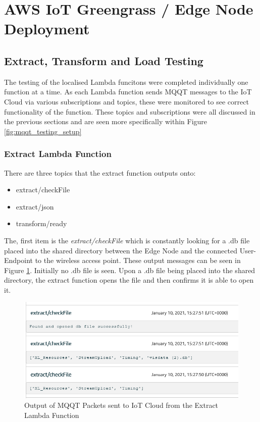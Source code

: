 \section{AWS IoT Greengrass / Edge Node Deployment}
\subsection{Extract, Transform and Load Testing}
The testing of the localised Lambda funcitons were completed individually one function at a time. As each Lambda function sends MQQT messages to the IoT Cloud via various subscriptions and topics, these were monitored to see correct functionality of the function. These topics and subscriptions were all discussed in the previous sections and are seen more specifically within Figure \ref{fig:mqqt_testing_setup}
\subsubsection{Extract Lambda Function}
There are three topics that the extract function outputs onto:
\begin{itemize}
    \item extract/checkFile
    \item extract/json
    \item transform/ready
\end{itemize}
The, first item is the \textit{extract/checkFile} which is constantly looking for a .db file placed into the shared directory between the Edge Node and the connected User-Endpoint to the wireless access point.  These output messages can be seen in Figure \ref{fig:extract_checkFile}. Initially no .db file is seen. Upon a .db file being placed into the shared directory, the extract function opens the file and then confirms it is able to open it.

\begin{figure}[ht]
    \centering
    \includegraphics[width=1\linewidth]{pages/Chapter5/Chapter 5 images/Lambda-Fns/extract_checkFile.png}
    \caption{Output of MQQT Packets sent to IoT Cloud from the Extract Lambda Function}
    \label{fig:extract_checkFile}
\end{figure}

